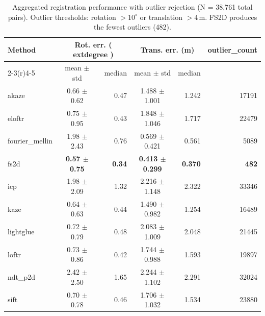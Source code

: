 \begin{table}[t]
\centering
\caption{Aggregated registration performance with outlier rejection (N = 38,761 total pairs). Outlier thresholds: rotation $>10^\circ$ or translation $>4$\,m. FS2D produces the fewest outliers (482).}
\label{tab:reg_summary}
\small
\begin{tabular}{lcrcrr}
\toprule
{Method} & \multicolumn{2}{c}{Rot. err. (	extdegree )} & \multicolumn{2}{c}{Trans. err. (m)} & {outlier\_count} \\
\cmidrule(r){2-3}\cmidrule(r){4-5}
 & {mean $\pm$ std} & {median} & {mean $\pm$ std} & {median} &  \\
\midrule
akaze & 0.66 $\pm$ 0.62 & 0.47 & 1.488 $\pm$ 1.001 & 1.242 & 17191 \\
eloftr & 0.75 $\pm$ 0.95 & 0.43 & 1.848 $\pm$ 1.046 & 1.717 & 22479 \\
fourier\_mellin & 1.98 $\pm$ 2.43 & 0.76 & 0.569 $\pm$ 0.421 & 0.561 & 5089 \\
fs2d & \bf{0.57 $\pm$ 0.75} & \bf{0.34} & \bf{0.413 $\pm$ 0.299} & \bf{0.370} & \bf{482} \\
icp & 1.98 $\pm$ 2.09 & 1.32 & 2.216 $\pm$ 1.148 & 2.322 & 33346 \\
kaze & 0.64 $\pm$ 0.63 & 0.44 & 1.490 $\pm$ 0.982 & 1.254 & 16489 \\
lightglue & 0.72 $\pm$ 0.79 & 0.48 & 2.083 $\pm$ 1.009 & 2.048 & 21445 \\
loftr & 0.73 $\pm$ 0.86 & 0.42 & 1.744 $\pm$ 0.988 & 1.593 & 19897 \\
ndt\_p2d & 2.42 $\pm$ 2.50 & 1.65 & 2.244 $\pm$ 1.102 & 2.291 & 32024 \\
sift & 0.70 $\pm$ 0.78 & 0.46 & 1.706 $\pm$ 1.032 & 1.534 & 23880 \\
\bottomrule
\end{tabular}
\end{table}
